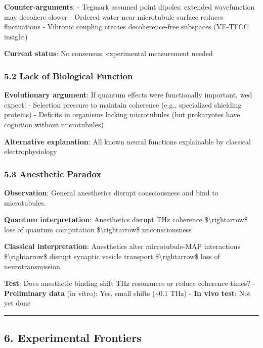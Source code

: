 \textbf{Counter-arguments}: - Tegmark assumed point dipoles; extended
wavefunction may decohere slower - Ordered water near microtubule
surface reduces fluctuations - Vibronic coupling creates
decoherence-free subspaces (VE-TFCC insight)

\textbf{Current status}: No consensus; experimental measurement needed

\subsubsection{5.2 Lack of Biological
Function}\label{lack-of-biological-function}

\textbf{Evolutionary argument}: If quantum effects were functionally
important, we\textquotesingle d expect: - Selection pressure to maintain
coherence (e.g., specialized shielding proteins) - Deficits in organisms
lacking microtubules (but prokaryotes have cognition without
microtubules)

\textbf{Alternative explanation}: All known neural functions explainable
by classical electrophysiology

\subsubsection{5.3 Anesthetic Paradox}\label{anesthetic-paradox}

\textbf{Observation}: General anesthetics disrupt consciousness and bind
to microtubules.

\textbf{Quantum interpretation}: Anesthetics disrupt THz coherence
\$\textbackslash rightarrow\$ loss of quantum computation
\$\textbackslash rightarrow\$ unconsciousness

\textbf{Classical interpretation}: Anesthetics alter microtubule-MAP
interactions \$\textbackslash rightarrow\$ disrupt synaptic vesicle
transport \$\textbackslash rightarrow\$ loss of neurotransmission

\textbf{Test}: Does anesthetic binding shift THz resonances or reduce
coherence times? - \textbf{Preliminary data} (in vitro): Yes, small
shifts (\textasciitilde0.1 THz) - \textbf{In vivo test}: Not yet done

\begin{center}\rule{0.5\linewidth}{0.5pt}\end{center}

\subsection{6. Experimental Frontiers}\label{experimental-frontiers}

